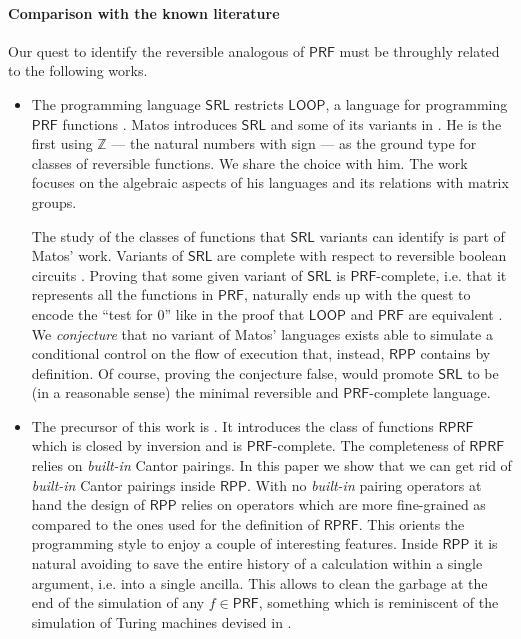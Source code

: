 \documentclass[runningheads]{llncs}
\newcommand{\RPP}{\textsf{RPP}\xspace}
\newcommand{\PRF}{\textsf{PRF}\xspace}
\newcommand{\Int}{\mathbb{Z}}
\newcommand{\RPRF}{\mathsf{R}\PRF} %
\begin{document}
\paragraph{Comparison with the known literature}
Our quest to identify the reversible  analogous of $ \PRF $  must be throughly related to the following works.
\begin{itemize}
    \item
    The programming language $ \mathsf{SRL} $  restricts $ \mathsf{LOOP} $, a language
    for programming $\PRF$ functions \cite{meyer1967acm}.
    Matos introduces $ \mathsf{SRL} $ and some of its variants in \cite{matos03tcs}.
    He is the first using $ \Int $ --- the natural numbers with sign --- as the ground type for
    classes of reversible functions.
    We share the choice with him.
    The work \cite{matos03tcs} focuses on the algebraic aspects of his languages and its relations with
    matrix groups.

    The study of the classes of functions that $ \mathsf{SRL} $ variants can identify
    is part of Matos' work.
    Variants of $\mathsf{SRL}$ are complete with respect to reversible boolean circuits \cite{matos2016notes}.
    Proving that some given variant of $\mathsf{SRL}$ is $ \mathsf{PRF} $-complete,
    i.e. that it represents all the functions in $ \mathsf{PRF} $, naturally ends up with the quest
    to encode the ``test for 0'' like in the proof that $ \mathsf{LOOP} $ and $ \mathsf{PRF} $ are equivalent \cite{meyer1967acm}.
    We \emph{conjecture} that no variant of Matos' languages exists able to simulate a conditional
    control on the flow of execution that, instead, $ \RPP $ contains by definition.
    Of course, proving the conjecture false, would promote $\mathsf{SRL}$ to be (in a reasonable sense) the minimal reversible and
    $ \mathsf{PRF} $-complete language.

    \item The precursor of this work is \cite{PaoliniPiccoloRoversiICTCS2015}. It introduces the class of functions $ \RPRF $ which is closed by inversion and is $\PRF$-complete.
    The completeness of $ \RPRF $ relies on \emph{built-in} Cantor pairings.
    In this paper we show that we can get rid of \emph{built-in} Cantor pairings inside $ \RPP $.
    With no \emph{built-in} pairing operators at hand the design of $ \RPP $ relies on operators which are more fine-grained as compared
    to the ones used for the definition of $ \RPRF $.
    This orients the programming style to enjoy a couple of interesting features.
    Inside $ \RPP $ it is natural avoiding to save the entire history of a calculation within a single argument, i.e. into a single ancilla.
    This allows to clean the garbage at the end of the simulation of any $ f\in\PRF $, something which is reminiscent of the simulation
    of Turing machines devised in \cite{bennett1989siamjc}.


\end{itemize}
\end{document}
